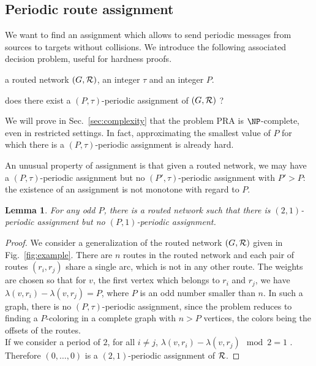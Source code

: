 \documentclass[10pt, conference, letterpaper]{IEEEtran}
\newtheorem{lemma}[theorem]{Lemma}
\begin{document}
      \subsection{Periodic route assignment}\label{nonmonotone}

    We want to find an assignment which allows to send periodic messages from sources to targets
    without collisions. We introduce the following associated decision problem, useful for hardness proofs.
    


       a routed network $(G,\cal R)$, an integer $\tau$ and an integer $P$.

       does there exist a $(P,\tau)$-periodic assignment of $(G,\cal R)$ ?


      We will prove in Sec.~\ref{sec:complexity} that the problem PRA is $\NP$-complete, even in restricted settings.
      In fact, approximating the smallest value of $P$ for which there is a $(P,\tau)$-periodic assignment is already hard.
      
      An unusual property of assignment is that given a routed network, we may have a $(P,\tau)$-periodic assignment but no
      $(P',\tau)$-periodic assignment with $P' > P$: the existence of an assignment is not monotone with regard to $P$.

	\begin{lemma} \label{lemma:monotonic}
	 For any odd $P$, there is a routed network such that there is $(2,1)$-periodic assignment but no $(P,1)$-periodic assignment.
	\end{lemma}
\begin{proof}

      We consider a generalization of the routed network $(G,{\cal R})$ given in Fig.~\ref{fig:example}. 
      There are $n$ routes in the routed network and each pair of routes $(r_i,r_j)$ share a single arc, which is not in any other route. The weights are chosen so that for $v$, the first vertex which belongs to $r_i$ and $r_j$, we have $\lambda(v,r_i) - \lambda(v,r_j)= P$, where $P$ is an odd number smaller than $n$. In such a graph, there is no $(P,\tau)$-periodic assignment, since the problem reduces to finding a $P$-coloring in a complete graph with $n > P$ vertices, the colors being the offsets of the routes.\\
      If we consider a period of $2$, for all $i \neq j$, $\lambda(v,r_i) - \lambda(v,r_j) \mod 2 = 1$ . Therefore $(0,\dots,0)$ is a $(2,1)$-periodic assignment of ${\cal R}$.      
\end{proof}
      
\end{document}

